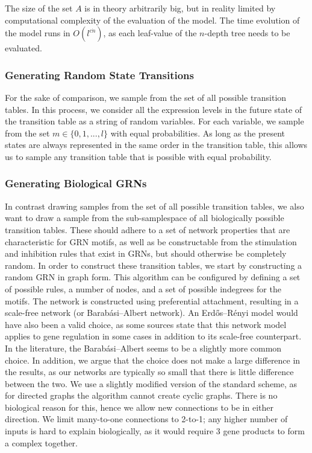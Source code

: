 \documentclass[../main.tex]{subfiles}
\begin{document}
The size of the set $A$ is in theory arbitrarily big, but in reality limited by computational complexity of the evaluation of the model. 
The time evolution of the model runs in $O(l^{c \dot n})$, as each leaf-value of the $n$-depth tree needs to be evaluated. 

\subsubsection{Generating Random State Transitions}

For the sake of comparison, we sample from the set of all possible transition tables.
In this process, we consider all the expression levels in the future state of the transition table as a string of random variables.
For each variable, we sample from the set $m \in \{0, 1, ..., l\}$ with equal probabilities.
As long as the present states are always represented in the same order in the transition table, this allows us to sample any transition table that is possible with equal probability.

\subsubsection{Generating Biological GRNs}

In contrast drawing samples from the set of all possible transition tables, we also want to draw a sample from the sub-samplespace of all biologically possible transition tables.
These should adhere to a set of network properties that are characteristic for GRN motifs, as well as be constructable from the stimulation and inhibition rules that exist in GRNs, but should otherwise be completely random.
In order to construct these transition tables, we start by constructing a random GRN in graph form.
This algorithm can be configured by defining a set of possible rules, a number of nodes, and a set of possible indegrees for the motifs.
The network is constructed using preferential attachment, resulting in a scale-free network (or Barabási–Albert network).
An Erdős–Rényi model would have also been a valid choice, as some sources state that this network model applies to gene regulation in some cases in addition to its scale-free counterpart.
In the literature, the Barabási–Albert seems to be a slightly more common choice.
In addition, we argue that the choice does not make a large difference in the results, as our networks are typically so small that there is little difference between the two.
We use a slightly modified version of the standard scheme, as for directed graphs the algorithm cannot create cyclic graphs.
There is no biological reason for this, hence we allow new connections to be in either direction.
We limit many-to-one connections to 2-to-1; any higher number of inputs is hard to explain biologically, as it would require 3 gene products to form a complex together.
\end{document}
